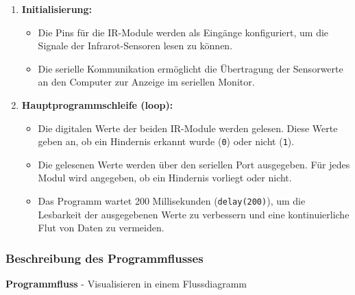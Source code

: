 \documentclass{vorlage-design-main}
\begin{document}
\begin{enumerate}
\def\labelenumi{\arabic{enumi}.}

\item
  \textbf{Initialisierung:}

  \begin{itemize}
  
  \item
    Die Pins für die IR-Module werden als Eingänge konfiguriert, um die
    Signale der Infrarot-Sensoren lesen zu können.
  \item
    Die serielle Kommunikation ermöglicht die Übertragung der
    Sensorwerte an den Computer zur Anzeige im seriellen Monitor.
  \end{itemize}
\item
  \textbf{Hauptprogrammschleife (loop):}

  \begin{itemize}
  
  \item
    Die digitalen Werte der beiden IR-Module werden gelesen. Diese Werte
    geben an, ob ein Hindernis erkannt wurde
    (\verb|0|) oder nicht
    (\verb|1|).
  \item
    Die gelesenen Werte werden über den seriellen Port ausgegeben. Für
    jedes Modul wird angegeben, ob ein Hindernis vorliegt oder nicht.
  \item
    Das Programm wartet 200 Millisekunden
    (\verb|delay(200)|), um die Lesbarkeit der
    ausgegebenen Werte zu verbessern und eine kontinuierliche Flut von
    Daten zu vermeiden.
  \end{itemize}
\end{enumerate}

\hypertarget{beschreibung-des-programmflusses}{%
\subsubsection{Beschreibung des
Programmflusses}\label{beschreibung-des-programmflusses}}

\textbf{Programmfluss} - Visualisieren in einem Flussdiagramm
\end{document}

